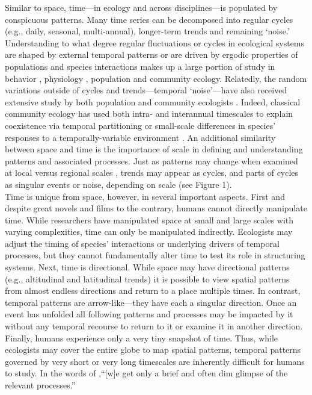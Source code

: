 \documentclass[11pt,a4paper,oneside]{article}
\begin{document}
Similar to space, time---in ecology and across disciplines---is populated by conspicuous patterns. Many time series can be decomposed into regular cycles (e.g., daily, seasonal, multi-annual), longer-term trends and remaining `noise.'  Understanding to what degree regular fluctuations or cycles in ecological systems are shaped by external temporal patterns or are driven by ergodic properties of populations and species interactions makes up a large portion of study in behavior \citep{macarthur1958}, physiology \citep{Lambers:2008jb}, population  \citep{May1976,Yang:2004zd} and community \citep{Chesson:1997dz} ecology.  Relatedly, the random variations outside of cycles and trends---temporal `noise'---have also received extensive study by both population \citep{Kaitala1997,Bjornstad:1999kl} and community ecologists \citep{Chesson:1997dz}. Indeed, classical community ecology has used both intra- \citep{Albrecht:2001id} and interannual \citep{Chesson:1997dz} timescales to explain coexistence via temporal partitioning or small-scale differences in species' responses to a temporally-variable environment \citep{macarthur1958,Hutchinson:1961ui}. An additional similarity between space and time is the importance of scale in defining and understanding patterns and associated processes. Just as patterns may change when examined at local versus regional scales \citep[e.g.,][]{Fridley:2007ct}, trends may appear as cycles, and parts of cycles as singular events or noise, depending on scale (see Figure 1). \\

Time is unique from space, however, in several important aspects. First and despite great novels and films to the contrary, humans cannot directly manipulate time. While researchers have manipulated space at small \citep[e.g.,][]{huffaker} and large \citep[e.g.,][]{Terborgh:2001bw} scales with varying complexities, time can only be manipulated indirectly. Ecologists may adjust the timing of species' interactions \citep{Yang:2010cq} or underlying drivers of temporal processes, but they cannot fundamentally alter time to test its role in structuring systems. Next, time is directional. While space may have directional patterns (e.g., altitudinal and latitudinal trends) it is possible to view spatial patterns from almost endless directions and return to a place multiple times. In contrast, temporal patterns are arrow-like---they have each a singular direction. Once an event has unfolded all following patterns and processes may be impacted by it without any temporal recourse to return to it or examine it in another direction. Finally, humans experience only a very tiny snapshot of time. Thus, while ecologists may cover the entire globe to map spatial patterns, temporal patterns governed by very short or very long timescales are inherently difficult for humans to study. In the words of \citet{wiens1986},``[w]e get only a brief and often dim glimpse of the relevant processes.'' \\
\end{document}
